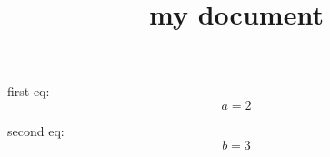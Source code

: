 \documentclass{article}
\title{my document}
\begin{document}

first eq:
\[
  a = 2
\]

second eq:
\[b=3\]


\end{document}

